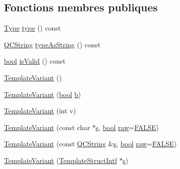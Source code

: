 \subsection*{Fonctions membres publiques}
\begin{DoxyCompactItemize}
\item 
\hyperlink{group__template__api_ga4c0d322ba971480bfbd2a8f418eadc81}{Type} \hyperlink{class_template_variant_a0ecde929e26b060fa747ef2996cff3a9}{type} () const 
\item 
\hyperlink{class_q_c_string}{Q\+C\+String} \hyperlink{class_template_variant_ab53cef3158c8fb05ba4c4fdb5186b2b9}{type\+As\+String} () const 
\item 
\hyperlink{qglobal_8h_a1062901a7428fdd9c7f180f5e01ea056}{bool} \hyperlink{class_template_variant_a772e0224697b18c250b12768b3ad17b5}{is\+Valid} () const 
\item 
\hyperlink{class_template_variant_a56e1f12ff7f2fc2f9c5d269495161201}{Template\+Variant} ()
\item 
\hyperlink{class_template_variant_ae41a75ce11e1187f0934f26bb78f8bd2}{Template\+Variant} (\hyperlink{qglobal_8h_a1062901a7428fdd9c7f180f5e01ea056}{bool} \hyperlink{060__command__switch_8tcl_a68bdb74c144118d936931c46f75d4b3e}{b})
\item 
\hyperlink{class_template_variant_a374d1ccdd4841ab6ddc7fa7cd23e69fd}{Template\+Variant} (int v)
\item 
\hyperlink{class_template_variant_a1a57277efae2fbb361f65c2992f61c6e}{Template\+Variant} (const char $\ast$\hyperlink{060__command__switch_8tcl_a011c73f2dbb87635a3b4206c72355f6e}{s}, \hyperlink{qglobal_8h_a1062901a7428fdd9c7f180f5e01ea056}{bool} \hyperlink{class_template_variant_aff07dc3f78f5862853eaebe1eed9689d}{raw}=\hyperlink{qglobal_8h_a10e004b6916e78ff4ea8379be80b80cc}{F\+A\+L\+S\+E})
\item 
\hyperlink{class_template_variant_af81e60a076fd6bb5fec55ee424797a85}{Template\+Variant} (const \hyperlink{class_q_c_string}{Q\+C\+String} \&\hyperlink{060__command__switch_8tcl_a011c73f2dbb87635a3b4206c72355f6e}{s}, \hyperlink{qglobal_8h_a1062901a7428fdd9c7f180f5e01ea056}{bool} \hyperlink{class_template_variant_aff07dc3f78f5862853eaebe1eed9689d}{raw}=\hyperlink{qglobal_8h_a10e004b6916e78ff4ea8379be80b80cc}{F\+A\+L\+S\+E})
\item 
\hyperlink{class_template_variant_a700516fd1c548baa21a65fd11b25e2b8}{Template\+Variant} (\hyperlink{class_template_struct_intf}{Template\+Struct\+Intf} $\ast$\hyperlink{060__command__switch_8tcl_a011c73f2dbb87635a3b4206c72355f6e}{s})

\end{DoxyCompactItemize}
